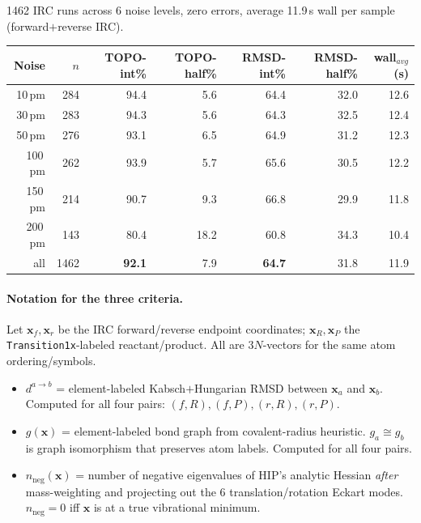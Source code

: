 \documentclass[11pt]{article}
\begin{document}
1462 IRC runs across 6 noise levels, zero errors, average 11.9\,s wall per sample
(forward$+$reverse IRC).

\begin{center}
\begin{tabular}{rrrrrrr}
\toprule
Noise & $n$ & TOPO-int\% & TOPO-half\% & RMSD-int\% & RMSD-half\% & wall$_{avg}$ (s) \\
\midrule
10\,pm  & 284 & 94.4 & 5.6  & 64.4 & 32.0 & 12.6 \\
30\,pm  & 283 & 94.3 & 5.6  & 64.3 & 32.5 & 12.4 \\
50\,pm  & 276 & 93.1 & 6.5  & 64.9 & 31.2 & 12.3 \\
100\,pm & 262 & 93.9 & 5.7  & 65.6 & 30.5 & 12.2 \\
150\,pm & 214 & 90.7 & 9.3  & 66.8 & 29.9 & 11.8 \\
200\,pm & 143 & 80.4 & 18.2 & 60.8 & 34.3 & 10.4 \\
\midrule
all     & 1462 & \textbf{92.1} & 7.9 & \textbf{64.7} & 31.8 & 11.9 \\
\bottomrule
\end{tabular}
\end{center}

\paragraph{Notation for the three criteria.}
Let $\mathbf{x}_f, \mathbf{x}_r$ be the IRC forward/reverse endpoint
coordinates; $\mathbf{x}_R, \mathbf{x}_P$ the \texttt{Transition1x}-labeled
reactant/product. All are $3N$-vectors for the same atom ordering/symbols.

\begin{itemize}[nosep,leftmargin=1.5em]
\item $d^{a \to b}$ = element-labeled Kabsch$+$Hungarian RMSD between
      $\mathbf{x}_a$ and $\mathbf{x}_b$. Computed for all four pairs:
      $(f,R), (f,P), (r,R), (r,P)$.
\item $g(\mathbf{x})$ = element-labeled bond graph from covalent-radius
      heuristic. $g_a \cong g_b$ is graph isomorphism that preserves atom
      labels. Computed for all four pairs.
\item $n_{\text{neg}}(\mathbf{x})$ = number of negative eigenvalues of HIP's
      analytic Hessian \emph{after} mass-weighting and projecting out the
      6 translation/rotation Eckart modes. $n_{\text{neg}} = 0$ iff
      $\mathbf{x}$ is at a true vibrational minimum.
\end{itemize}
\end{document}
